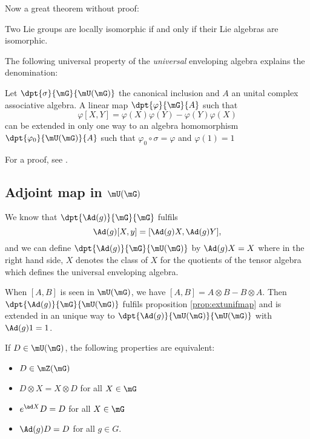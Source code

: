 Now a great theorem without proof:
\begin{theorem}
Two Lie groups are locally isomorphic if and only if their Lie algebras are isomorphic.
 \label{tho:loc_isom}
\end{theorem}

The following universal property of the \emph{universal} enveloping algebra explains the denomination:

\begin{proposition}
Let $\dpt{\sigma}{\mG}{\mU(\mG)}$ the canonical inclusion and $A$ an unital complex associative algebra. A linear map $\dpt{\varphi}{\mG}{A}$ such that
\begin{equation}
\varphi[X,Y]=\varphi(X)\varphi(Y)-\varphi(Y)\varphi(X)
\end{equation}
can be extended in only one way to an algebra homomorphism $\dpt{\varphi_0}{\mU(\mG)}{A}$ such that $\varphi_0\circ\sigma=\varphi$ and $\varphi(1)=1$
\label{prop:extunifmap}
\end{proposition}
For a proof, see \cite{Knapp_reprez}.

\subsection{Adjoint map in \texorpdfstring{$\mU(\mG)$}{U(G)}}   \label{ssadjunif}

We know that $\dpt{ \Ad(g) }{ \mG }{ \mG }$ fulfils
\[ 
  \Ad(g)[X,y]=[  \Ad(g)X,\Ad(g)Y  ],
\]
and we can define $\dpt{ \Ad(g) }{ \mG }{ \mU(\mG) }$ by $\Ad(g)X=X$ where in the right hand side, $X$ denotes the class of $X$ for the quotients of the tensor algebra which defines the universal enveloping algebra.

When $[A,B]$ is seen in $\mU(\mG)$, we have $[A,B]=A\otimes B-B\otimes A$. Then $\dpt{ \Ad(g) }{ \mG }{ \mU(\mG) }$ fulfils proposition \ref{prop:extunifmap} and is extended in an unique way to $\dpt{ \Ad(g) }{ \mU(\mG) }{ \mU(\mG) }$ with $\Ad(g)1=1$.
 
\begin{lemma} 
    If $D\in\mU(\mG)$, the following properties are equivalent:
    \begin{itemize}
        \item $D\in\mZ(\mG)$
        \item $D\otimes X=X\otimes D$ for all $X\in \mG$
        \item $e^{\ad X}D=D$ for all $X\in\mG$
        \item $\Ad(g)D=D$ for all $g\in G$.
    \end{itemize}
     \label{lem:equivDAd}
\end{lemma}

